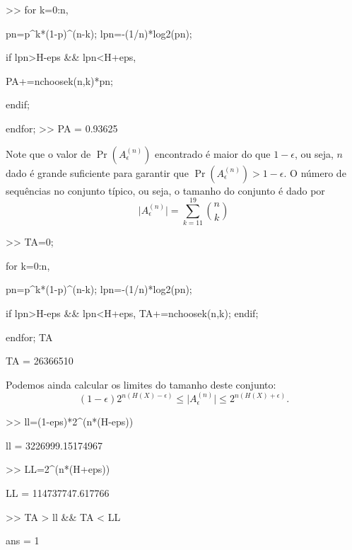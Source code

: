 \begin{frame}[allowframebreaks]
\begin{exercise}
\begin{semiverbatim}
  >> for k=0:n, 
 
	pn=p\^{}k*(1-p)\^{}(n-k); lpn=-(1/n)*log2(pn); 

	if lpn>H-eps \&\& lpn<H+eps, 

		PA+=nchoosek(n,k)*pn; 

	endif; 

     endfor; 
  >> PA =  0.93625
  \end{semiverbatim}
  Note que o valor de $\Pr(A_{\epsilon}^{(n)})$ encontrado é maior do que $1-\epsilon$, ou seja,
  $n$ dado é grande suficiente para garantir que $\Pr(A_{\epsilon}^{(n)}) > 1-\epsilon$.
  \exercisebreak
  O número de sequências no conjunto típico, ou seja, o tamanho do conjunto é dado por
  \begin{equation}
  \vert A_{\epsilon}^{(n)} \vert = \sum_{k=11}^{19} {n \choose k} 
  \end{equation}
  \begin{semiverbatim}
  >> TA=0; 

  for k=0:n, 

     pn=p\^{}k*(1-p)\^{}(n-k); lpn=-(1/n)*log2(pn); 

     if lpn>H-eps \&\& lpn<H+eps, TA+=nchoosek(n,k); endif; 

  endfor; TA

  TA =  26366510
  \end{semiverbatim}
  \exercisebreak
  Podemos ainda calcular os limites do tamanho deste conjunto:
  \begin{equation}
  (1-\epsilon)2^{n(H(X)-\epsilon)} \leq \vert A_{\epsilon}^{(n)} \vert \leq 2^{n(H(X)+\epsilon)} .
  \end{equation}
  \begin{semiverbatim}  
  >> ll=(1-eps)*2\^{}(n*(H-eps))

  ll =  3226999.15174967

  >> LL=2\^{}(n*(H+eps))

  LL =  114737747.617766

  >> TA > ll \&\& TA < LL

  ans =  1
  \end{semiverbatim}


  \end{exercise}
\end{frame}
